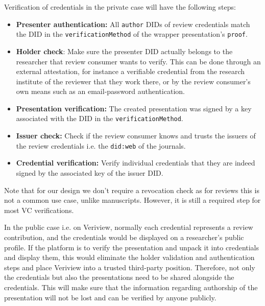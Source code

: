 Verification of credentials in the private case will have the following steps:
\begin{itemize}
    \item \textbf{Presenter authentication:} All \lstinline{author} \acrshort{DID}s of review credentials match the \acrshort{DID} in the \lstinline{verificationMethod} of the wrapper presentation's \lstinline{proof}.
    
    \item \textbf{Holder check}: Make sure the presenter \acrshort{DID} actually belongs to the researcher that review consumer wants to verify. This can be done through an external attestation, for instance a verifiable credential from the research institute of the reviewer that they work there, or by the review consumer's own means such as an email-password authentication. 
    
    \item \textbf{Presentation verification:} The created presentation was signed by a key associated with the \acrshort{DID} in the \lstinline{verificationMethod}.
    
    \item \textbf{Issuer check:} Check if the review consumer knows and trusts the issuers of the review credentials i.e. the \lstinline{did:web} of the journals.
    
    \item \textbf{Credential verification:} Verify individual credentials that they are indeed signed by the associated key of the issuer \acrshort{DID}.
\end{itemize}

Note that for our design we don't require a revocation check as for reviews this is not a common use case, unlike manuscripts. However, it is still a required step for most \acrshort{VC} verifications.

In the public case i.e. on Veriview, normally each credential represents a review contribution, and the credentials would be displayed on a researcher's public profile. If the platform is to verify the presentation and unpack it into credentials and display them, this would eliminate the holder validation and authentication steps and place Veriview into a trusted third-party position. Therefore, not only the credentials but also the presentations need to be shared alongside the credentials. This will make sure that the information regarding authorship of the presentation will not be lost and can be verified by anyone publicly. 

